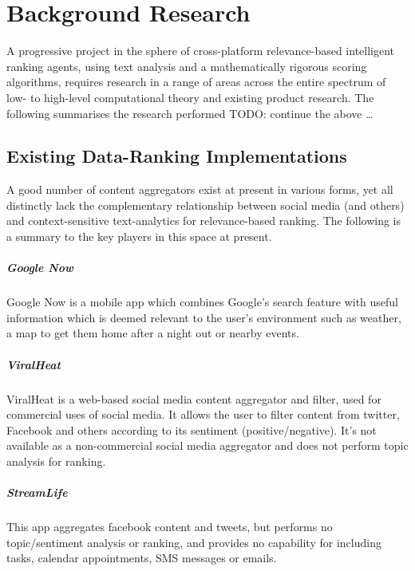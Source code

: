 \chapter{Background Research}

A progressive project in the sphere of cross-platform relevance-based intelligent ranking agents, using text analysis and a mathematically rigorous scoring algorithms, requires research in a range of areas across the entire spectrum of low- to high-level computational theory and existing product research. The following summarises the research performed 
TODO: continue the above \dots

\section{Existing Data-Ranking Implementations}

A good number of content aggregators exist at present in various forms, yet all distinctly lack the complementary relationship between social media (and others) and context-sensitive text-analytics for relevance-based ranking. The following is a summary to the key players in this space at present.

\paragraph{Google Now}
Google Now is a mobile app which combines Google's search feature with useful information which is deemed relevant to the user's environment such as weather, a map to get them home after a night out or nearby events.

\paragraph{ViralHeat}
ViralHeat is a web-based social media content aggregator and filter, used for commercial uses of social media. It allows the user to filter content from twitter, Facebook and others according to its sentiment (positive/negative). It's not available as a non-commercial social media aggregator and does not perform topic analysis for ranking.

\paragraph{StreamLife}
This app aggregates facebook content and tweets, but performs no topic/sentiment analysis or ranking, and provides no capability for including tasks, calendar appointments, SMS messages or emails.

